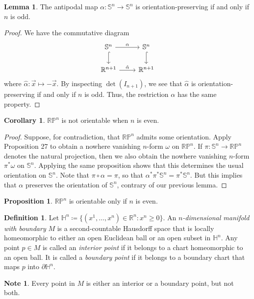 \documentclass[10pt,letterpaper,cm]{nupset}
\theoremstyle{definition}
\newtheorem*{definition}{Definition}
\newtheorem{corollary}{Corollary}
\newtheorem{lemma}{Lemma}
\newtheorem*{note}{Note}
\newtheorem{prop}{Proposition}
\renewcommand{\H}{\mathbb H}
\newcommand{\R}{\mathbb R}
\newcommand{\RP}{\mathbb{RP}}
\renewcommand{\S}{\mathbb S}
\newcommand{\1}{\mathbf{1}}
\newcommand{\x}{\vec x}
\newcommand{\0}{\vec 0}
\begin{document}
\begin{lemma}
The antipodal map $\alpha : \S^n \to \S^n$ is orientation-preserving  if and only if $n$ is odd.
\end{lemma}
\begin{proof}
We have the commutative diagram
\[
\begin{tikzcd}
\S^n \arrow[r, "\alpha"] \arrow[d, hook] & \S^n \arrow[d, hook] \\
\R^{n+1} \arrow[r, "\hat{\alpha}"] & \R^{n+1}
\end{tikzcd}
\]
where $\hat{\alpha} : \x \mapsto -\x$. By inspecting $\det(I_{n+1})$, we see that $\hat{\alpha}$ is orientation-preserving  if and only if $n$ is odd. Thus, the restriction $\alpha$ has the same property.
\end{proof}

\begin{corollary}
$\RP^n$ is not orientable when $n$ is even. 
\end{corollary}
\begin{proof}
Suppose, for contradiction, that $\RP^n$ admits some orientation. Apply Proposition 27 to obtain a nowhere vanishing $n$-form $\omega$ on $\RP^n$. If $\pi : \S^n \to \RP^n$ denotes the natural projection, then we also obtain the nowhere vanishing $n$-form $\pi^{\ast}\omega$ on $\S^n$. Applying the same proposition shows that this determines the usual orientation on $\S^n$. Note that $\pi \circ \alpha = \pi$, so that $\alpha^{\ast} \pi^{\ast} \S^n = \pi^{\ast}\S^n$. But this implies that $\alpha$ preserves the orientation of $\S^n$, contrary of our previous lemma.
\end{proof}

\begin{prop}
$\RP^n$ is orientable only if $n$ is even. 
\end{prop}

\begin{definition}
Let $\H^n\coloneqq  \{(x^1, \ldots, x^n) \in \R^n : x^n \geq 0\}.$ An \textit{$n$-dimensional manifold with boundary} $M$ is a second-countable Hausdorff space that is locally homeomorphic to either an open Euclidean ball or an open subset in $\H^n$. Any point $p\in M$ is called an \textit{interior point} if it belongs to a chart homeomorphic to an open ball. It is called a \textit{boundary point} if it belongs to a boundary chart that maps $p$ into $\partial{\H^n}$.
\end{definition}
\begin{note}
Every point in $M$ is either an interior or a boundary point, but not both.
\end{note}
\end{document}
